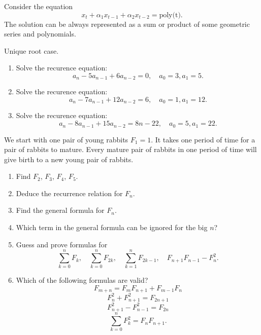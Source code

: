\documentclass[12pt]{article}
\begin{document}
\begin{idea}
    Consider the equation 
    \[
    x_t + \alpha_1 x_{t-1} + \alpha_2 x_{t-2} = \textrm{poly(t)}.
    \]
    The solution can be always represented as a sum or product of some geometric series and polynomials.
\end{idea}


\begin{exercise}
Unique root case. 
\begin{enumerate}[label=\alph*)]
    \item Solve the recurence equation:
    \[
    a_n - 5 a_{n-1} + 6 a_{n-2} = 0, \quad a_0 = 3, a_1 = 5.
    \]
    \item Solve the recurence equation:
    \[
    a_n - 7 a_{n-1} + 12 a_{n-2} = 6, \quad a_0 = 1, a_1 = 12.
    \]
    \item Solve the recurence equation:
    \[
    a_n - 8 a_{n-1} + 15 a_{n-2} = 8n - 22 , \quad a_0 = 5, a_1 = 22.
    \]
\end{enumerate}
\end{exercise}

\begin{exercise}
    We start with one pair of young rabbits $F_1 = 1$. 
    It takes one period of time for a pair of rabbits to mature. 
    Every mature pair of rabbits in one period of time will give birth to a new young pair of rabbits. 

    \begin{enumerate}[label=\alph*)]
        \item Find $F_2$, $F_3$, $F_4$, $F_5$.
        \item Deduce the recurrence relation for $F_n$.
        \item Find the general formula for $F_n$.
        \item Which term in the general formula can be ignored for the big $n$?
        \item Guess and prove formulas for 
        \[
        \sum_{k=0}^n F_k, \quad \sum_{k=0}^n F_{2k}, \quad \sum_{k = 1}^n F_{2k-1}, \quad F_{n+1} F_{n-1} - F_n^2.
        \]
        \item Which of the following formulas are valid?
        \[
        F_{m + n} = F_m F_{n+1} + F_{m-1} F_n
        \]
        \[
        F_n^2 + F_{n+1}^2 = F_{2n+1}
        \]
        \[
        F_{n+1}^2 - F_{n-1}^2 = F_{2n}
        \]
        \[
        \sum_{k=0}^n F_k^2 = F_n F_{n+1}.
        \]
    \end{enumerate}

\end{exercise}
\end{document}
